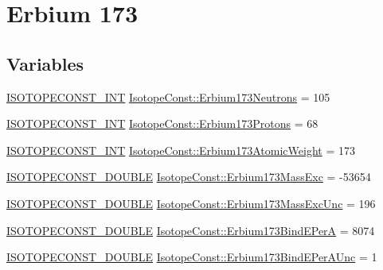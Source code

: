 \hypertarget{group___isotope_const-_erbium-_er173}{}\section{Erbium 173}
\label{group___isotope_const-_erbium-_er173}
\subsection*{Variables}
\begin{DoxyCompactItemize}
\item 
\mbox{\hyperlink{group___isotope_const-_macros_ga5f18360b3e99483a35c32d789e62621c}{I\+S\+O\+T\+O\+P\+E\+C\+O\+N\+S\+T\+\_\+\+I\+NT}} \mbox{\hyperlink{group___isotope_const-_erbium-_er173_ga6e6dfa28f4dd8aecb8de9c060b7406fa}{Isotope\+Const\+::\+Erbium173\+Neutrons}} = 105
\item 
\mbox{\hyperlink{group___isotope_const-_macros_ga5f18360b3e99483a35c32d789e62621c}{I\+S\+O\+T\+O\+P\+E\+C\+O\+N\+S\+T\+\_\+\+I\+NT}} \mbox{\hyperlink{group___isotope_const-_erbium-_er173_ga41ebf010ee83284ef8d893c0bfb5c501}{Isotope\+Const\+::\+Erbium173\+Protons}} = 68
\item 
\mbox{\hyperlink{group___isotope_const-_macros_ga5f18360b3e99483a35c32d789e62621c}{I\+S\+O\+T\+O\+P\+E\+C\+O\+N\+S\+T\+\_\+\+I\+NT}} \mbox{\hyperlink{group___isotope_const-_erbium-_er173_gac55bf79b1bbc133c54a26eecde6a3306}{Isotope\+Const\+::\+Erbium173\+Atomic\+Weight}} = 173
\item 
\mbox{\hyperlink{group___isotope_const-_macros_ga8f45a7272ce02c0b4c65c44636ed719a}{I\+S\+O\+T\+O\+P\+E\+C\+O\+N\+S\+T\+\_\+\+D\+O\+U\+B\+LE}} \mbox{\hyperlink{group___isotope_const-_erbium-_er173_ga135276a9fe7427296b689ac7958059ac}{Isotope\+Const\+::\+Erbium173\+Mass\+Exc}} = -\/53654
\item 
\mbox{\hyperlink{group___isotope_const-_macros_ga8f45a7272ce02c0b4c65c44636ed719a}{I\+S\+O\+T\+O\+P\+E\+C\+O\+N\+S\+T\+\_\+\+D\+O\+U\+B\+LE}} \mbox{\hyperlink{group___isotope_const-_erbium-_er173_ga41ca6910477d58efbe68f3ade7d411cb}{Isotope\+Const\+::\+Erbium173\+Mass\+Exc\+Unc}} = 196
\item 
\mbox{\hyperlink{group___isotope_const-_macros_ga8f45a7272ce02c0b4c65c44636ed719a}{I\+S\+O\+T\+O\+P\+E\+C\+O\+N\+S\+T\+\_\+\+D\+O\+U\+B\+LE}} \mbox{\hyperlink{group___isotope_const-_erbium-_er173_ga5073fd5ea2a005ed2a6299703204e48e}{Isotope\+Const\+::\+Erbium173\+Bind\+E\+PerA}} = 8074
\item 
\mbox{\hyperlink{group___isotope_const-_macros_ga8f45a7272ce02c0b4c65c44636ed719a}{I\+S\+O\+T\+O\+P\+E\+C\+O\+N\+S\+T\+\_\+\+D\+O\+U\+B\+LE}} \mbox{\hyperlink{group___isotope_const-_erbium-_er173_gaff1f3dfe7ad194ac363fa20f62a2313e}{Isotope\+Const\+::\+Erbium173\+Bind\+E\+Per\+A\+Unc}} = 1

\end{DoxyCompactItemize}
